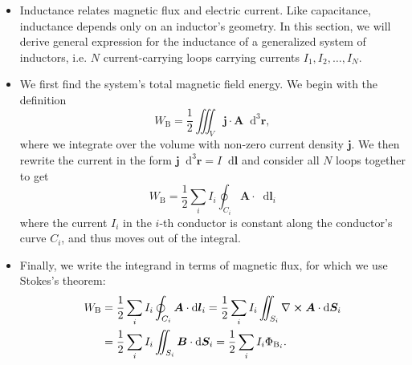 \documentclass[11pt, a4paper]{article}
\newcommand{\diff}{\mathop{}\!\mathrm{d}} %
\newcommand{\dr}{\diff^{3} \r}  %
\renewcommand{\vec}[1]{\bm{#1}} %
\renewcommand{\r}{\vec{r}}
\newcommand{\B}{\vec{B}} %
\newcommand{\A}{\vec{A}} %
\renewcommand{\j}{\vec{j}}  %
\renewcommand{\curl}{\nabla \cross}
\begin{document}
\begin{itemize}
	\item Inductance relates magnetic flux and electric current. Like capacitance, inductance depends only on an inductor's geometry. In this section, we will derive general expression for the inductance of a generalized system of inductors, i.e. $ N $ current-carrying loops carrying currents $ I_{1}, I_{2}, \ldots, I_{N} $.
	
	\item We first find the system's total magnetic field energy. We begin with the definition
	\begin{equation*}
		W_{\text{B}} = \frac{1}{2}\iiint_{V}\j \cdot \A \dr,
	\end{equation*}
	where we integrate over the volume with non-zero current density $ \j $. We then rewrite the current in the form $ \j \dr = I \diff \vec{l} $ and consider all $ N $ loops together to get
	\begin{equation*}
		W_{\text{B}} = \frac{1}{2}\sum_{i}I_{i}\oint_{C_{i}} \A \cdot \diff \vec{l}_{i}
	\end{equation*}
	where the current $ I_{i} $ in the $ i $-th conductor is constant along the conductor's curve $ C_{i} $, and thus moves out of the integral.
	
	\item Finally, we write the integrand in terms of magnetic flux, for which we use Stokes's theorem:
	\begin{align*}
        W_{\text{B}} &= \frac{1}{2}\sum_{i}I_{i}\oint_{C_{i}} \A \cdot \diff \vec{l}_{i} = \frac{1}{2}\sum_{i}I_{i}\iint_{S_{i}} \curl \A \cdot \diff \vec{S}_{i} \\
        &= \frac{1}{2}\sum_{i}I_{i}\iint_{S_{i}} \B \cdot \diff \vec{S}_{i} = \frac{1}{2}\sum_{i}I_{i} \Phi_{\text{B}_{i}}.
	\end{align*}
	

\end{itemize}
\end{document}
